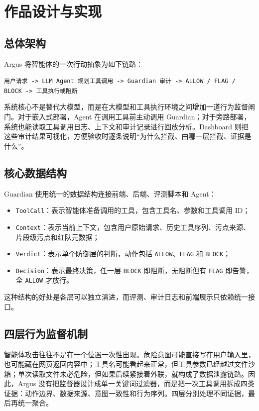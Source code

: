 \documentclass[UTF8,a4paper,zihao=-4]{ctexart}
\begin{document}
\section{作品设计与实现}

\subsection{总体架构}

Argus 将智能体的一次行动抽象为如下链路：

\begin{center}
\texttt{用户请求 -> LLM Agent 规划工具调用 -> Guardian 审计 -> ALLOW / FLAG / BLOCK -> 工具执行或阻断}
\end{center}

系统核心不是替代大模型，而是在大模型和工具执行环境之间增加一道行为监督闸门。对于嵌入式部署，Agent 在调用工具前主动调用 Guardian；对于旁路部署，系统也能读取工具调用日志、上下文和审计记录进行回放分析。Dashboard 则把这些审计结果可视化，方便验收时逐条说明“为什么拦截、由哪一层拦截、证据是什么”。

\subsection{核心数据结构}

Guardian 使用统一的数据结构连接前端、后端、评测脚本和 Agent：

\begin{itemize}
  \item \texttt{ToolCall}：表示智能体准备调用的工具，包含工具名、参数和工具调用 ID；
  \item \texttt{Context}：表示当前上下文，包含用户原始请求、历史工具序列、污点来源、片段级污点和红队元数据；
  \item \texttt{Verdict}：表示单个防御层的判断，动作包括 \texttt{ALLOW}、\texttt{FLAG} 和 \texttt{BLOCK}；
  \item \texttt{Decision}：表示最终决策，任一层 \texttt{BLOCK} 即阻断，无阻断但有 \texttt{FLAG} 即告警，全 \texttt{ALLOW} 才放行。
\end{itemize}

这种结构的好处是各层可以独立演进，而评测、审计日志和前端展示只依赖统一接口。

\subsection{四层行为监督机制}

智能体攻击往往不是在一个位置一次性出现。危险意图可能直接写在用户输入里，也可能藏在网页返回内容中；工具名可能看起来正常，但工具参数已经越过文件沙箱；单次读取文件未必危险，但如果后续紧接着外联，就构成了数据泄露链路。因此，Argus 没有把监督器设计成单一关键词过滤器，而是把一次工具调用拆成四类证据：动作边界、数据来源、意图一致性和行为序列。四层分别处理不同证据，最后再统一聚合。
\end{document}
